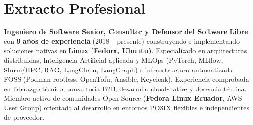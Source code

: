 
\section{Extracto Profesional}
\small{
  \textbf{Ingeniero de Software Senior, Consultor y Defensor del Software Libre} con \textbf{9 años de experiencia} (2018 -- presente) construyendo e implementando soluciones nativas en \textbf{Linux (Fedora, Ubuntu)}. Especializado en arquitecturas distribuidas, Inteligencia Artificial aplicada y MLOps (PyTorch, MLflow, Slurm/HPC, RAG, LangChain, LangGraph) e infraestructura automatizada FOSS (Podman rootless, OpenTofu, Ansible, Keycloak). Experiencia comprobada en liderazgo técnico, consultoría B2B, desarrollo cloud-native y docencia técnica. Miembro activo de comunidades Open Source (\textbf{Fedora Linux Ecuador}, AWS User Group) orientado al desarrollo en entornos POSIX flexibles e independientes de proveedor.
}
